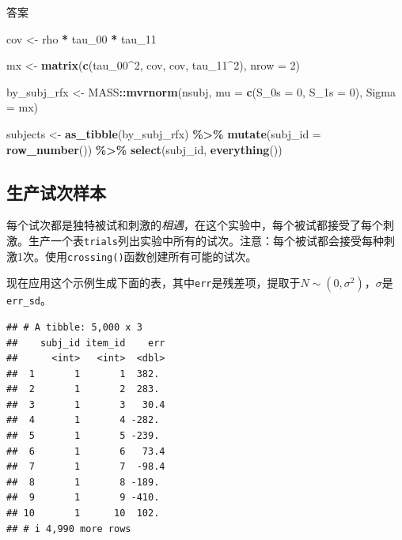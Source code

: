 \documentclass[
]{book}
\newenvironment{Shaded}{\begin{snugshade}}{\end{snugshade}}
\newcommand{\AttributeTok}[1]{\textcolor[rgb]{0.13,0.29,0.53}{#1}}
\newcommand{\DecValTok}[1]{\textcolor[rgb]{0.00,0.00,0.81}{#1}}
\newcommand{\FunctionTok}[1]{\textcolor[rgb]{0.13,0.29,0.53}{\textbf{#1}}}
\newcommand{\NormalTok}[1]{#1}
\newcommand{\OtherTok}[1]{\textcolor[rgb]{0.56,0.35,0.01}{#1}}
\newcommand{\SpecialCharTok}[1]{\textcolor[rgb]{0.81,0.36,0.00}{\textbf{#1}}}
\begin{document}
答案

\begin{Shaded}
\begin{Highlighting}[]
\NormalTok{cov }\OtherTok{\textless{}{-}}\NormalTok{ rho }\SpecialCharTok{*}\NormalTok{ tau\_00 }\SpecialCharTok{*}\NormalTok{ tau\_11}

\NormalTok{mx }\OtherTok{\textless{}{-}} \FunctionTok{matrix}\NormalTok{(}\FunctionTok{c}\NormalTok{(tau\_00}\SpecialCharTok{\^{}}\DecValTok{2}\NormalTok{, cov,}
\NormalTok{               cov,      tau\_11}\SpecialCharTok{\^{}}\DecValTok{2}\NormalTok{),}
             \AttributeTok{nrow =} \DecValTok{2}\NormalTok{)}

\NormalTok{by\_subj\_rfx }\OtherTok{\textless{}{-}}\NormalTok{ MASS}\SpecialCharTok{::}\FunctionTok{mvrnorm}\NormalTok{(nsubj, }\AttributeTok{mu =} \FunctionTok{c}\NormalTok{(}\AttributeTok{S\_0s =} \DecValTok{0}\NormalTok{, }\AttributeTok{S\_1s =} \DecValTok{0}\NormalTok{), }\AttributeTok{Sigma =}\NormalTok{ mx)}

\NormalTok{subjects }\OtherTok{\textless{}{-}} \FunctionTok{as\_tibble}\NormalTok{(by\_subj\_rfx) }\SpecialCharTok{\%\textgreater{}\%}
  \FunctionTok{mutate}\NormalTok{(}\AttributeTok{subj\_id =} \FunctionTok{row\_number}\NormalTok{()) }\SpecialCharTok{\%\textgreater{}\%}
  \FunctionTok{select}\NormalTok{(subj\_id, }\FunctionTok{everything}\NormalTok{())}
\end{Highlighting}
\end{Shaded}

\hypertarget{ux751fux4ea7ux8bd5ux6b21ux6837ux672c}{%
\subsection{生产试次样本}\label{ux751fux4ea7ux8bd5ux6b21ux6837ux672c}}

每个试次都是独特被试和刺激的\emph{相遇}，在这个实验中，每个被试都接受了每个刺激。生产一个表\texttt{trials}列出实验中所有的试次。注意：每个被试都会接受每种刺激1次。使用\texttt{crossing()}函数创建所有可能的试次。

现在应用这个示例生成下面的表，其中\texttt{err}是残差项，提取于\(N \sim \left(0, \sigma^2\right)\)，\(\sigma\)是\texttt{err\_sd}。

\begin{verbatim}
## # A tibble: 5,000 x 3
##    subj_id item_id    err
##      <int>   <int>  <dbl>
##  1       1       1  382. 
##  2       1       2  283. 
##  3       1       3   30.4
##  4       1       4 -282. 
##  5       1       5 -239. 
##  6       1       6   73.4
##  7       1       7  -98.4
##  8       1       8 -189. 
##  9       1       9 -410. 
## 10       1      10  102. 
## # i 4,990 more rows
\end{verbatim}
\end{document}
